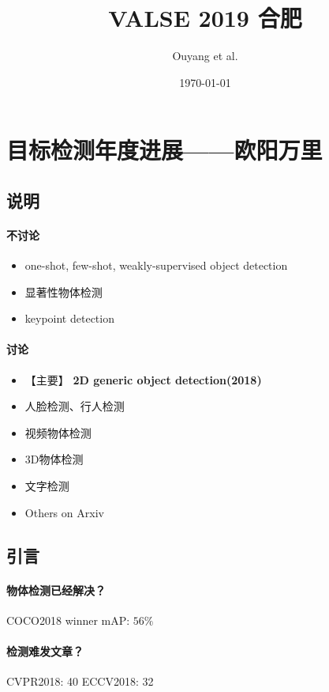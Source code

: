 \documentclass[UTF8, a4paper]{ctexart}
\begin{document}
\title{VALSE 2019 合肥}
\author{Ouyang et al.}
\date\today
\maketitle
\fi
\section{目标检测年度进展——欧阳万里}

\subsection{说明}
\paragraph{不讨论}
\begin{itemize}
    \item one-shot, few-shot, weakly-supervised object detection
    \item 显著性物体检测
    \item keypoint detection
\end{itemize}

\paragraph{讨论}
\begin{itemize}
    \item 【主要】 \textbf{2D generic object detection(2018)}
    \item 人脸检测、行人检测
    \item 视频物体检测
    \item 3D物体检测
    \item 文字检测
    \item Others on Arxiv
\end{itemize}

\subsection{引言}

\paragraph{物体检测已经解决？} COCO2018 winner mAP: $56\%$

\paragraph{检测难发文章？} CVPR2018: 40 ECCV2018: 32
\end{document}
